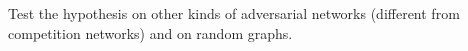\documentclass[preview]{standalone}
\begin{document}
Test the hypothesis on other kinds of adversarial networks (different from competition networks) and on random graphs.\\
\end{document}
